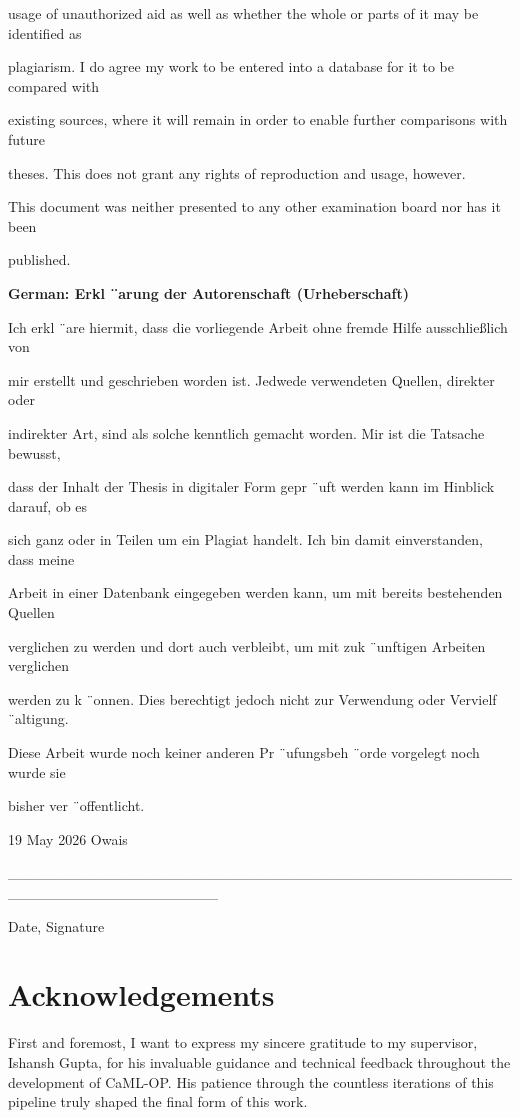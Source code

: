 usage of unauthorized aid as well as whether the whole or parts of it may be identified as

plagiarism. I do agree my work to be entered into a database for it to be compared with

existing sources, where it will remain in order to enable further comparisons with future

theses. This does not grant any rights of reproduction and usage, however.

This document was neither presented to any other examination board nor has it been

published.

\textbf{German: Erkl ¨arung der Autorenschaft (Urheberschaft)}

Ich erkl ¨are hiermit, dass die vorliegende Arbeit ohne fremde Hilfe ausschließlich von

mir erstellt und geschrieben worden ist. Jedwede verwendeten Quellen, direkter oder

indirekter Art, sind als solche kenntlich gemacht worden. Mir ist die Tatsache bewusst,

dass der Inhalt der Thesis in digitaler Form gepr ¨uft werden kann im Hinblick darauf, ob es

sich ganz oder in Teilen um ein Plagiat handelt. Ich bin damit einverstanden, dass meine

Arbeit in einer Datenbank eingegeben werden kann, um mit bereits bestehenden Quellen

verglichen zu werden und dort auch verbleibt, um mit zuk ¨unftigen Arbeiten verglichen

werden zu k ¨onnen. Dies berechtigt jedoch nicht zur Verwendung oder Vervielf ¨altigung.

Diese Arbeit wurde noch keiner anderen Pr ¨ufungsbeh ¨orde vorgelegt noch wurde sie

bisher ver ¨offentlicht.

19 May 2026 Owais

\_\_\_\_\_\_\_\_\_\_\_\_\_\_\_\_\_\_\_\_\_\_\_\_\_\_\_\_\_\_\_\_\_\_\_\_\_\_\_\_\_\_\_\_\_\_\_\_\_\_\_\_\_\_\_\_\_\_\_\_\_\_\_\_\_\_\_\_

Date, Signature

\chapter*{Acknowledgements}

First and foremost, I want to express my sincere gratitude to my supervisor, Ishansh Gupta, for his invaluable guidance and technical feedback throughout the development of CaML-OP. His patience through the countless iterations of this pipeline truly shaped the final form of this work.


